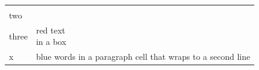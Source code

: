 \documentclass{article}
\begin{document}
\begin{tabular}{lp{4cm}}
\begin{minipage}[t]{3cm}one\\two\\three\end{minipage} & \parbox[t]{3cm}{\color{red}red text\\in a box} \\
x & {\color{blue}blue} words in a paragraph cell that wraps to a second line \\
\end{tabular}
\end{document}
